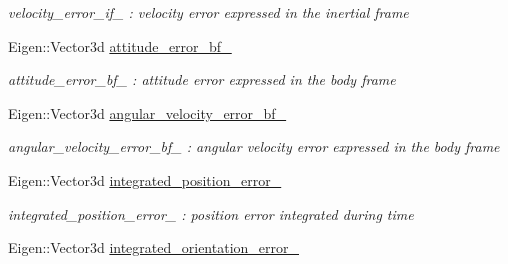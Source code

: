 \begin{DoxyCompactItemize}
\begin{DoxyCompactList}\small\item\em velocity\-\_\-error\-\_\-if\-\_\- \-: velocity error expressed in the inertial frame \end{DoxyCompactList}\item 
\hypertarget{class_skye_geometric_controller_aad66d7dc8861eb8cf274fad6340b33fc}{Eigen\-::\-Vector3d \hyperlink{class_skye_geometric_controller_aad66d7dc8861eb8cf274fad6340b33fc}{attitude\-\_\-error\-\_\-bf\-\_\-}}\label{class_skye_geometric_controller_aad66d7dc8861eb8cf274fad6340b33fc}

\begin{DoxyCompactList}\small\item\em attitude\-\_\-error\-\_\-bf\-\_\- \-: attitude error expressed in the body frame \end{DoxyCompactList}\item 
\hypertarget{class_skye_geometric_controller_ab3ece2f07bfaf880fd8d8f029668487b}{Eigen\-::\-Vector3d \hyperlink{class_skye_geometric_controller_ab3ece2f07bfaf880fd8d8f029668487b}{angular\-\_\-velocity\-\_\-error\-\_\-bf\-\_\-}}\label{class_skye_geometric_controller_ab3ece2f07bfaf880fd8d8f029668487b}

\begin{DoxyCompactList}\small\item\em angular\-\_\-velocity\-\_\-error\-\_\-bf\-\_\- \-: angular velocity error expressed in the body frame \end{DoxyCompactList}\item 
\hypertarget{class_skye_geometric_controller_a9671e67e8d54b52edc884bfe38aac942}{Eigen\-::\-Vector3d \hyperlink{class_skye_geometric_controller_a9671e67e8d54b52edc884bfe38aac942}{integrated\-\_\-position\-\_\-error\-\_\-}}\label{class_skye_geometric_controller_a9671e67e8d54b52edc884bfe38aac942}

\begin{DoxyCompactList}\small\item\em integrated\-\_\-position\-\_\-error\-\_\- \-: position error integrated during time \end{DoxyCompactList}\item 
\hypertarget{class_skye_geometric_controller_ab6dea6c596b65a65b6a785c8defb4c3f}{Eigen\-::\-Vector3d \hyperlink{class_skye_geometric_controller_ab6dea6c596b65a65b6a785c8defb4c3f}{integrated\-\_\-orientation\-\_\-error\-\_\-}}\label{class_skye_geometric_controller_ab6dea6c596b65a65b6a785c8defb4c3f}


\end{DoxyCompactItemize}
